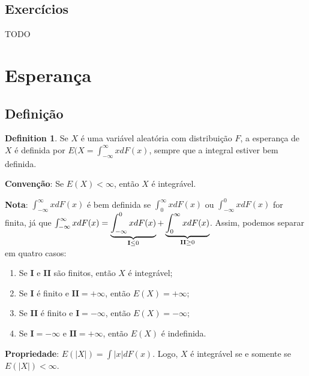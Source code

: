 \documentclass[
]{article}
\providecommand{\tightlist}{%
  \setlength{\itemsep}{0pt}\setlength{\parskip}{0pt}}
\theoremstyle{definition}
\newtheorem{definition}{Definition}[section]
\theoremstyle{definition}
\theoremstyle{definition}
\theoremstyle{definition}
\theoremstyle{remark}
\begin{document}
\newpage

\hypertarget{exercuxedcios-1}{%
\subsection{Exercícios}\label{exercuxedcios-1}}

TODO

\newpage

\hypertarget{esperanuxe7a}{%
\section{Esperança}\label{esperanuxe7a}}

\hypertarget{definiuxe7uxe3o}{%
\subsection{Definição}\label{definiuxe7uxe3o}}

\begin{definition}
Se \(X\) é uma variável aleatória com distribuição \(F\), a esperança de \(X\) é definida por \(E(X = \int_{-\infty}^{\infty}x dF(x)\), sempre que a integral estiver bem definida.
\end{definition}

\textbf{Convenção}: Se \(E(X) < \infty\), então \(X\) é integrável.

\textbf{Nota}: \(\int_{-\infty}^{\infty}xdF(x)\) é bem definida se \(\int_{0}^{\infty}xdF(x)\) ou \(\int_{-\infty}^{0}xdF(x)\) for finita, já que \(\int_{-\infty}^{\infty}xdF(x) = \underbrace{\int_{-\infty}^{0}xdF(x)}_{\mathclap{\mathbf{I} \le 0}} + \underbrace{\int_{0}^{\infty}xdF(x)}_{\mathclap{\mathbf{II} \ge 0}}\). Assim, podemos separar em quatro casos:

\begin{enumerate}
\def\labelenumi{\arabic{enumi}.}
\tightlist
\item
  Se \textbf{I} e \textbf{II} são finitos, então \(X\) é integrável;
\item
  Se \textbf{I} é finito e \(\mathbf{II} = +\infty\), então \(E(X) = +\infty\);
\item
  Se \textbf{II} é finito e \(\mathbf{I} = -\infty\), então \(E(X) = -\infty\);
\item
  Se \(\mathbf{I} = -\infty\) e \(\mathbf{II} = +\infty\), então \(E(X)\) é indefinida.
\end{enumerate}

\textbf{Propriedade}: \(E(|X|) = \int |x| dF(x)\). Logo, \(X\) é integrável se e somente se \(E(|X|) < \infty\).
\end{document}
